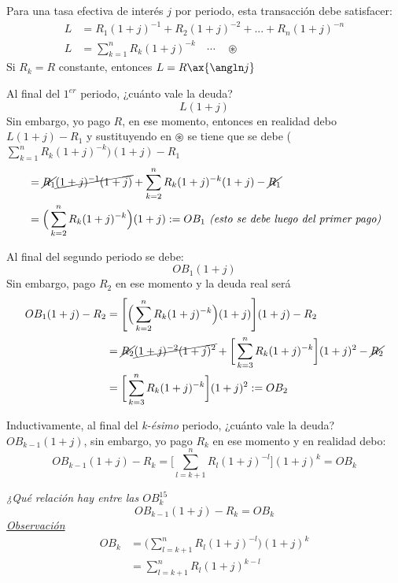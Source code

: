 \begin{center}
\begin{tikzpicture}[x=0.75pt,y=0.75pt,yscale=-1,xscale=1]
\end{tikzpicture}

\end{center}

Para una tasa efectiva de interés $j$ por periodo, esta transacción debe satisfacer:
\begin{align*}
    L &= R_1(1+j)^{-1} + R_2(1+j)^{-2} +...+ R_n(1+j)^{-n}\\
    L &= \sum_{k=1}^n R_k(1+j)^{-k} \quad\dotsm\quad\circledast
\end{align*}
Si $R_k=R$ constante, entonces $L=R\ax{\angln j}$

Al final del $1^{er}$ periodo, ¿cuánto vale la deuda?
$$L(1+j)$$
Sin embargo, yo pago $R$, en ese momento, entonces en realidad debo $L(1+j)-R_1$ y sustituyendo en $\circledast$ se tiene que se debe \Big($\sum_{k=1}^nR_k(1+j)^{-k}\Big)(1+j)-R_1$
\begin{align*}
    &= \cancel{R_1}\cancel{(1+j)^{-1}(1+j)} + \sum_{k=2}^nR_k(1+j)^{-k}(1+j)-\cancel{R_1}\\
    &= \Big(\sum_{k=2}^nR_k(1+j)^{-k}\Big)(1+j) := OB_1 \textit{ (esto se debe luego del primer pago)}
\end{align*}

Al final del segundo periodo se debe:
$$OB_1(1+j)$$
Sin embargo, pago $R_2$ en ese momento y la deuda real será
\begin{align*}
    OB_1(1+j)-R_2 &= \Bigg[\Big(\sum_{k=2}^nR_k(1+j)^{-k}\Big)(1+j)\Bigg](1+j) - R_2\\
    &= \cancel{R_2}\cancel{(1+j)^{-2}(1+j)^2} + \bigg[\sum_{k=3}^nR_k(1+j)^{-k}\bigg](1+j)^2 - \cancel{R_2}\\
    &= \bigg[\sum_{k=3}^nR_k(1+j)^{-k}\bigg](1+j)^2 := OB_2
\end{align*}

Inductivamente, al final del \textit{k-ésimo} periodo, ¿cuánto vale la deuda? $OB_{k-1}(1+j)$, sin embargo, yo pago $R_k$ en ese momento y en realidad debo:
$$OB_{k-1}(1+j)-R_k= \bigg[\sum_{l=k+1}^nR_l(1+j)^{-l}\bigg] (1+j)^k = OB_k$$

\textit{¿Qué relación hay entre las $OB_k^{15}$}
$$OB_{k-1} (1+j) -R_k =OB_k$$
\textit{\underline{Observación}}
\begin{align*}
    OB_k &= \big( \sum_{l=k+1}^n R_l(1+j)^{-l} \big)(1+j)^k\\
    &= \sum_{l=k+1}^n R_l(1+j)^{k-l}
\end{align*}

